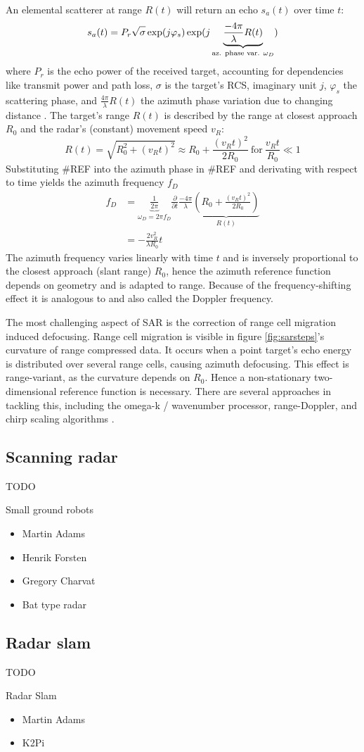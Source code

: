 An elemental scatterer at range \(R(t)\) will return an echo \(s_a(t)\)
over time \(t\): \[
s_a(t) = P_r \sqrt{\sigma\vphantom{1}} \exp(j\varphi_s)\exp(j \underbrace{\frac{-4\pi}{\lambda}R(t)}_\text{az. phase var. $\omega_D$})
\] where \(P_r\) is the echo power of the received target, accounting
for dependencies like transmit power and path loss, \(\sigma\) is the
target's RCS, imaginary unit \(j\), \(\varphi_s\) the scattering phase,
and \(\frac{4\pi}{\lambda}R(t)\) the azimuth phase variation due to
changing distance \cite{Cumming2004}. The target's range \(R(t)\) is
described by the range at closest approach \(R_0\) and the radar's
(constant) movement speed \(v_R\): \[
R(t) = \sqrt{R_0^2+\left(v_Rt\right)^2} \approx R_0 + \frac{(v_Rt)^2}{2R_0} ~\text{for}~ \frac{v_Rt}{R_0} \ll 1
\] Substituting \#REF into the azimuth phase in \#REF and derivating
with respect to time yields the azimuth frequency \(f_D\) \[
\begin{aligned}
f_D &= \underbrace{\frac{1}{2\pi}}_{\omega_D = 2\pi f_D} \frac{\partial}{\partial t} \frac{-4\pi}{\lambda}  \underbrace{\left( R_0 + \frac{(v_Rt)^2}{2R_0}  \right)}_{R(t)} \\
&= -\frac{2v_R^2}{\lambda R_0}t
\end{aligned}
\] The azimuth frequency varies linearly with time \(t\) and is
inversely proportional to the closest approach (slant range) \(R_0\),
hence the azimuth reference function depends on geometry and is adapted
to range. Because of the frequency-shifting effect it is analogous to
and also called the Doppler frequency.

The most challenging aspect of SAR is the correction of range cell
migration induced defocusing. Range cell migration is visible in figure
\ref{fig:sarsteps}'s curvature of range compressed data. It occurs when a point
target's echo energy is distributed over several range cells, causing
azimuth defocusing. This effect is range-variant, as the curvature
depends on \(R_0\). Hence a non-stationary two-dimensional reference
function is necessary. There are several approaches in tackling this,
including the omega-k / wavenumber processor, range-Doppler, and chirp
scaling algorithms \cite{Moreira2013}.

\subsection{Scanning radar}\label{scanning-radar}

TODO

Small ground robots

\begin{itemize}
\item
  Martin Adams
\item
  Henrik Forsten
\item
  Gregory Charvat
\item
  Bat type radar
\end{itemize}

\subsection{Radar slam}\label{radar-slam}

TODO

Radar Slam

\begin{itemize}
\item
  Martin Adams
\item
  K2Pi
\end{itemize}
